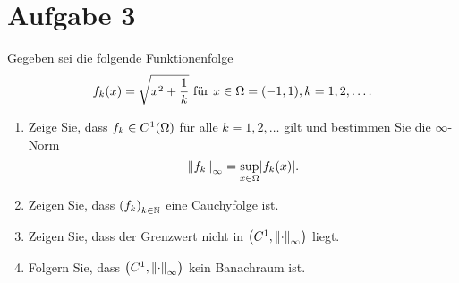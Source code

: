 \documentclass{exercise}
\begin{document}
    \clearpage\section*{Aufgabe 3}

    \begin{problem}
        Gegeben sei die folgende Funktionenfolge
        \[
            f_k\parentheses*{x} = \sqrt{x^2 + \frac{1}{k}}\text{ für }x \in \Omega = \parentheses*{-1, 1}, k = 1, 2, \ldots.
        \]
        \begin{enumerate}
            \item Zeige Sie, dass \(f_k \in C^1\parentheses*{\Omega}\) für alle \(k = 1, 2, \ldots\) gilt und bestimmen Sie die \(\infty\)-Norm
            \[
                \norm*{f_k}_\infty = \sup_{x \in \Omega}\absolute*{f_k\parentheses*{x}}.
            \]
            \item Zeigen Sie, dass \(\parentheses*{f_k}_{k \in \N}\) eine Cauchyfolge ist.
            \item Zeigen Sie, dass der Grenzwert nicht in \(\parentheses*{C^1, \norm*{\cdot}_\infty}\) liegt.
            \item Folgern Sie, dass \(\parentheses*{C^1, \norm*{\cdot}_\infty}\) kein Banachraum ist.
        \end{enumerate}
    \end{problem}
\end{document}

